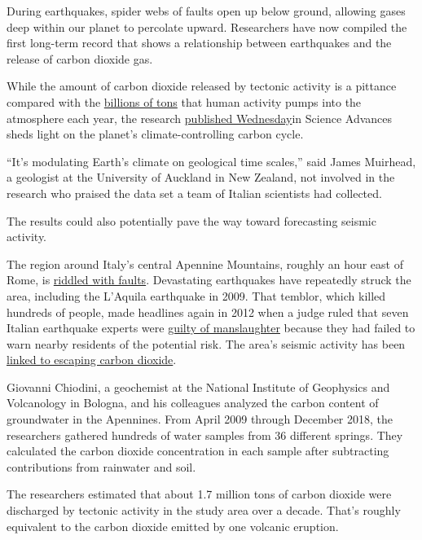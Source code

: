 During earthquakes, spider webs of faults open up below ground, allowing
gases deep within our planet to percolate upward. Researchers have now
compiled the first long-term record that shows a relationship between
earthquakes and the release of carbon dioxide gas.

While the amount of carbon dioxide released by tectonic activity is a
pittance compared with the
\href{https://www.epa.gov/ghgemissions/sources-greenhouse-gas-emissions}{billions
of tons} that human activity pumps into the atmosphere each year, the
research
\href{https://advances.sciencemag.org/lookup/doi/10.1126/sciadv.abc2938}{published
Wednesday}in Science Advances sheds light on the planet's
climate-controlling carbon cycle.

``It's modulating Earth's climate on geological time scales,'' said
James Muirhead, a geologist at the University of Auckland in New
Zealand, not involved in the research who praised the data set a team of
Italian scientists had collected.

The results could also potentially pave the way toward forecasting
seismic activity.

The region around Italy's central Apennine Mountains, roughly an hour
east of Rome, is
\href{https://www.bbc.com/news/science-environment-37176502}{riddled
with faults}. Devastating earthquakes have repeatedly struck the area,
including the L'Aquila earthquake in 2009. That temblor, which killed
hundreds of people, made headlines again in 2012 when a judge ruled that
seven Italian earthquake experts were
\href{https://www.nytimes3xbfgragh.onion/2012/10/23/world/europe/italy-convicts-7-for-failure-to-warn-of-quake.html?searchResultPosition=2}{guilty
of manslaughter} because they had failed to warn nearby residents of the
potential risk. The area's seismic activity has been
\href{https://www.nature.com/articles/ngeo2622}{linked to escaping
carbon dioxide}.

Giovanni Chiodini, a geochemist at the National Institute of Geophysics
and Volcanology in Bologna, and his colleagues analyzed the carbon
content of groundwater in the Apennines. From April 2009 through
December 2018, the researchers gathered hundreds of water samples from
36 different springs. They calculated the carbon dioxide concentration
in each sample after subtracting contributions from rainwater and soil.

The researchers estimated that about 1.7 million tons of carbon dioxide
were discharged by tectonic activity in the study area over a decade.
That's roughly equivalent to the carbon dioxide emitted by one volcanic
eruption.

